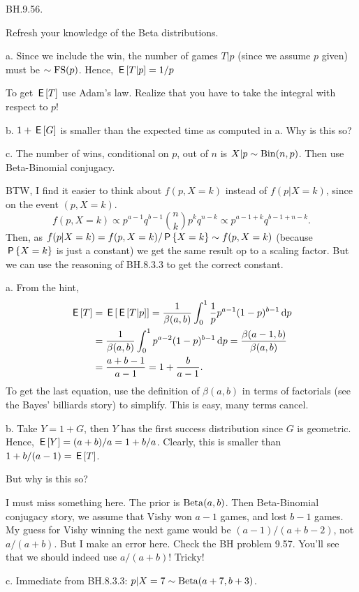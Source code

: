 \setcounter{theorem}{55}
\begin{exercise}
BH.9.56.
\begin{hint}
Refresh your  knowledge of the Beta distributions.

a. Since we include the win, the number of games $T|p$ (since we assume $p$ given) must be $\sim\FS{p}$. Hence, $\E{T|p} = 1/p$

To get $\E T$ use Adam's law. Realize that you have to take the integral with respect to $p$!

b. $1+\E G$ is smaller than the expected time as computed in a. Why is this so?

c. The number of wins, conditional on $p$, out of $n$ is $X|p\sim\Bin{n,p}$. Then use Beta-Binomial conjugacy.

BTW, I find it easier to think about $f(p, X=k)$ instead of $f(p|X=k)$, since on the event $(p, X=k)$.
\begin{equation*}
f(p, X=k) \propto p^{a-1} q^{b-1} {n \choose k} p^k q^{n-k} \propto p^{a-1+k}q^{b-1+n-k}.
\end{equation*}
Then, as  $f(p|X=k) = f(p, X=k)/\P{X=k} \sim f(p, X=k)$ (because $\P{X=k}$ is just a constant) we get the same result op to a scaling factor. But we can use the reasoning of BH.8.3.3 to get the correct constant.
\end{hint}
\begin{solution}
a. From the hint,
\begin{align*}
\E{T}
&=\E{\E{T|p}} = \frac{1}{\beta(a,b)}\int_0^{1}\frac 1 p p^{a-1}(1-p)^{b-1} \d p \\
&= \frac{1}{\beta(a,b)}\int_0^{1} p^{a-2}(1-p)^{b-1} \d p
= \frac{\beta(a-1, b)}{\beta(a,b)} \\
&= \frac{a+b-1}{a-1} = 1 + \frac b {a-1}.
\end{align*}
To get the last equation,  use the definition of $\beta(a,b)$ in terms of factorials (see the Bayes' billiards story) to simplify. This is easy, many terms cancel.


b. Take $Y=1+G$, then $Y$ has the first success distribution since $G$ is geometric. Hence, $\E Y = (a+b)/a= 1 + b/a$. Clearly, this is smaller than $1+b/(a-1) = \E T$.

But why is this so?


I must miss something here.
The prior is $\Beta{a, b}$.
Then Beta-Binomial conjugacy story, we assume that Vishy won $a-1$ games, and lost $b-1$ games.
My guess for Vishy winning the next game would be $(a-1)/(a+b-2)$, not $a/(a+b)$.
But I make an error here. Check the BH problem 9.57. You'll see that we should indeed use $a/(a+b)$!  Tricky!

c.  Immediate from BH.8.3.3: $p|X=7 \sim\Beta{a+7, b+3}$.
\end{solution}
\end{exercise}



